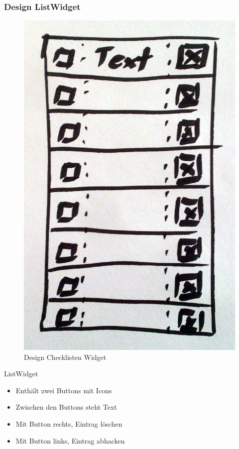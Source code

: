 \begin{frame}
	\frametitle{Design ListWidget}
%
	\begin{minipage}{0.49\textwidth}
		\begin{figure}
			\centering
			\includegraphics[height = 0.7\textheight]{../grafiken/list-widget-design}
			\caption{Design Checklisten Widget}
		\end{figure}	
	\end{minipage}
%
	\begin{minipage}{0.44\textwidth}
		\begin{block}{ListWidget}
			\begin{itemize}
				\item Enthält zwei Buttons mit Icons
				\item Zwischen den Buttons steht Text
				\item Mit Button rechts, Eintrag löschen
				\item Mit Button links, Eintrag abhacken
			\end{itemize}
		\end{block}
	\end{minipage}
\end{frame}
